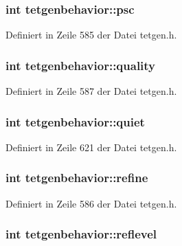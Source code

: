 \hypertarget{classtetgenbehavior_aa0dcda160582fc2d2e39689961c47cfc}{
\subsubsection[{psc}]{\setlength{\rightskip}{0pt plus 5cm}int tetgenbehavior\-::psc}}\label{classtetgenbehavior_aa0dcda160582fc2d2e39689961c47cfc}


Definiert in Zeile 585 der Datei tetgen.\-h.

\hypertarget{classtetgenbehavior_ac071721fb930cc08160743886b412889}{
\subsubsection[{quality}]{\setlength{\rightskip}{0pt plus 5cm}int tetgenbehavior\-::quality}}\label{classtetgenbehavior_ac071721fb930cc08160743886b412889}


Definiert in Zeile 587 der Datei tetgen.\-h.

\hypertarget{classtetgenbehavior_a92ce32e3060160286cec778e757ea6fe}{
\subsubsection[{quiet}]{\setlength{\rightskip}{0pt plus 5cm}int tetgenbehavior\-::quiet}}\label{classtetgenbehavior_a92ce32e3060160286cec778e757ea6fe}


Definiert in Zeile 621 der Datei tetgen.\-h.

\hypertarget{classtetgenbehavior_a1db02f7b2524f86a79e5835bece8c6cd}{
\subsubsection[{refine}]{\setlength{\rightskip}{0pt plus 5cm}int tetgenbehavior\-::refine}}\label{classtetgenbehavior_a1db02f7b2524f86a79e5835bece8c6cd}


Definiert in Zeile 586 der Datei tetgen.\-h.

\hypertarget{classtetgenbehavior_aedcb3e57800acfb18eb9a31766cf8477}{
\subsubsection[{reflevel}]{\setlength{\rightskip}{0pt plus 5cm}int tetgenbehavior\-::reflevel}}\label{classtetgenbehavior_aedcb3e57800acfb18eb9a31766cf8477}


